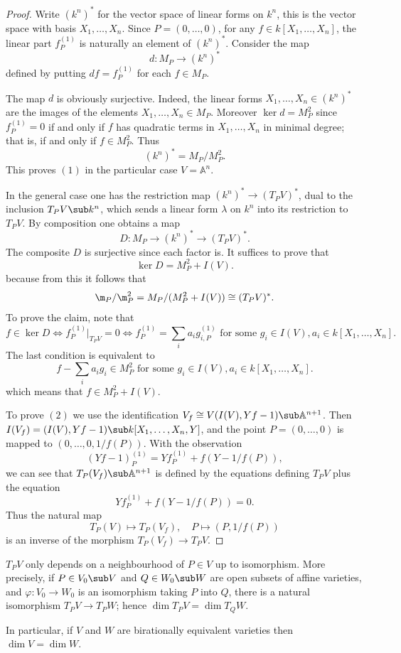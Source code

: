 \begin{proof}
Write $(k^n)^*$ for the vector space of linear forms on $k^n$, this is the vector space with basis $X_1,\dots,X_n$. Since $P=(0,\dots,0)$, for any $f\in k[X_1,\dots,X_n]$, the linear part $f^{(1)}_P$ is naturally an element of $(k^n)^*$. Consider the map
\[d:M_P\to (k^n)^*\]
defined by putting $df=f^{(1)}_P$ for each $f\in M_P$.\par
The map $d$ is obviously surjective. Indeed, the linear forms $X_1,\dots,X_n\in (k^n)^*$ are the images of the elements $X_1,\dots,X_n\in M_P$. Moreover $\ker d=M_P^2$ since $f^{(1)}_P=0$ if and only if $f$ has quadratic terms in $X_1,\dots,X_n$ in minimal degree; that is, if and only if $f\in M_P^2$. Thus
\[(k^n)^*=M_P/M_P^2.\]
This proves $(1)$ in the particular case $V=\mathbb{A}^n$.\par
In the general case one has the restriction map $(k^n)^*\to(T_PV)^*$, dual to the inclusion $T_PV\sub k^n$, which sends a linear form $\lambda$ on $k^n$ into its restriction to $T_PV$. By composition one obtains a map
\[D:M_P\to (k^n)^*\to(T_PV)^*.\]
The composite $D$ is surjective since each factor is. It suffices to prove that
\[\ker D=M_P^2+I(V).\]
because from this it follows that
\[\m_P/\m_P^2=M_P/(M_P^2+I(V))\cong (T_PV)^*.\]
To prove the claim, note that
\[f\in\ker D\iff f^{(1)}_P|_{T_PV}=0\iff f_P^{(1)}=\sum_ia_ig_{i,P}^{(1)}\text{ for some $g_i\in I(V),a_i\in k[X_1,\dots,X_n]$}.\]
The last condition is equivalent to 
\[f-\sum_ia_ig_i\in M_P^2\text{ for some $g_i\in I(V),a_i\in k[X_1,\dots,X_n]$}.\]
which means that $f\in M_P^2+I(V)$.\par
To prove $(2)$ we use the identification $V_f\cong V(I(V),Yf-1)\sub\mathbb{A}^{n+1}$. Then $I(V_f)=(I(V),Yf-1)\sub k[X_1,\dots,X_n,Y]$, and the point $P=(0,\dots,0)$ is mapped to $(0,\dots,0,1/f(P))$. With the observation
\[(Yf-1)^{(1)}_{P}=Yf^{(1)}_P+f(Y-1/f(P)),\]
we can see that $T_P(V_f)\sub\mathbb{A}^{n+1}$ is defined by the equations defining $T_PV$ plus the equation 
\[Yf^{(1)}_P+f(Y-1/f(P))=0.\]
Thus the natural map 
\[T_P(V)\mapsto T_P(V_f),\quad P\mapsto(P,1/f(P))\]
is an inverse of the morphism $T_P(V_f)\to T_PV$.
\end{proof}
\begin{corollary}
$T_PV$ only depends on a neighbourhood of $P\in V$ up to isomorphism. More precisely, if $P\in V_0\sub V$ and $Q\in W_0\sub W$ are open subsets of affine varieties, and $\varphi:V_0\to W_0$ is an isomorphism taking $P$ into $Q$, there is a natural isomorphism $T_PV\to T_PW$; hence $\dim T_PV=\dim T_QW$.\par
In particular, if $V$ and $W$ are birationally equivalent varieties then $\dim V=\dim W$.
\end{corollary}

